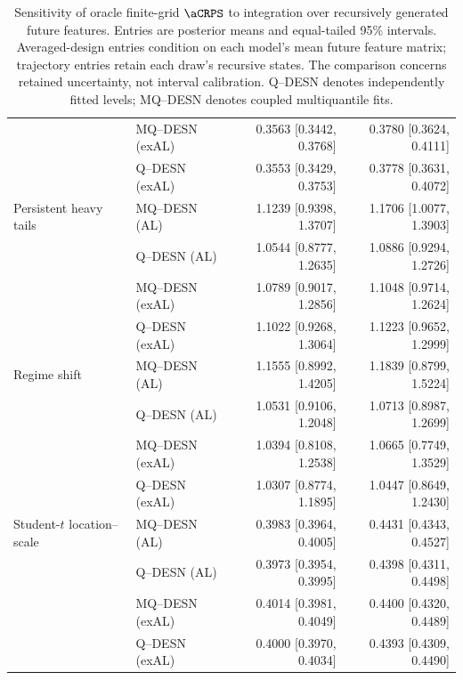 \begin{table}[p]
\begin{tabular}{@{}>{\raggedright\arraybackslash}p{}lrr@{}}
 & MQ--DESN (exAL) & 0.3563 [0.3442, 0.3768] & 0.3780 [0.3624, 0.4111] \\
 & Q--DESN (exAL) & 0.3553 [0.3429, 0.3753] & 0.3778 [0.3631, 0.4072] \\
\addlinespace[2pt]
Persistent heavy tails & MQ--DESN (AL) & 1.1239 [0.9398, 1.3707] & 1.1706 [1.0077, 1.3903] \\
 & Q--DESN (AL) & 1.0544 [0.8777, 1.2635] & 1.0886 [0.9294, 1.2726] \\
 & MQ--DESN (exAL) & 1.0789 [0.9017, 1.2856] & 1.1048 [0.9714, 1.2624] \\
 & Q--DESN (exAL) & 1.1022 [0.9268, 1.3064] & 1.1223 [0.9652, 1.2999] \\
\addlinespace[2pt]
Regime shift & MQ--DESN (AL) & 1.1555 [0.8992, 1.4205] & 1.1839 [0.8799, 1.5224] \\
 & Q--DESN (AL) & 1.0531 [0.9106, 1.2048] & 1.0713 [0.8987, 1.2699] \\
 & MQ--DESN (exAL) & 1.0394 [0.8108, 1.2538] & 1.0665 [0.7749, 1.3529] \\
 & Q--DESN (exAL) & 1.0307 [0.8774, 1.1895] & 1.0447 [0.8649, 1.2430] \\
\addlinespace[2pt]
Student-\(t\) location--scale & MQ--DESN (AL) & 0.3983 [0.3964, 0.4005] & 0.4431 [0.4343, 0.4527] \\
 & Q--DESN (AL) & 0.3973 [0.3954, 0.3995] & 0.4398 [0.4311, 0.4498] \\
 & MQ--DESN (exAL) & 0.4014 [0.3981, 0.4049] & 0.4400 [0.4320, 0.4489] \\
 & Q--DESN (exAL) & 0.4000 [0.3970, 0.4034] & 0.4393 [0.4309, 0.4490] \\
\bottomrule
\end{tabular}
\caption{Sensitivity of oracle finite-grid \(\aCRPS\) to integration over recursively generated future features. Entries are posterior means and equal-tailed 95\% intervals. Averaged-design entries condition on each model's mean future feature matrix; trajectory entries retain each draw's recursive states. The comparison concerns retained uncertainty, not interval calibration. Q--DESN denotes independently fitted levels; MQ--DESN denotes coupled multiquantile fits.}
\label{tab:joint-qdesn-pure-desn-v2-recursive-policy}
\end{table}
